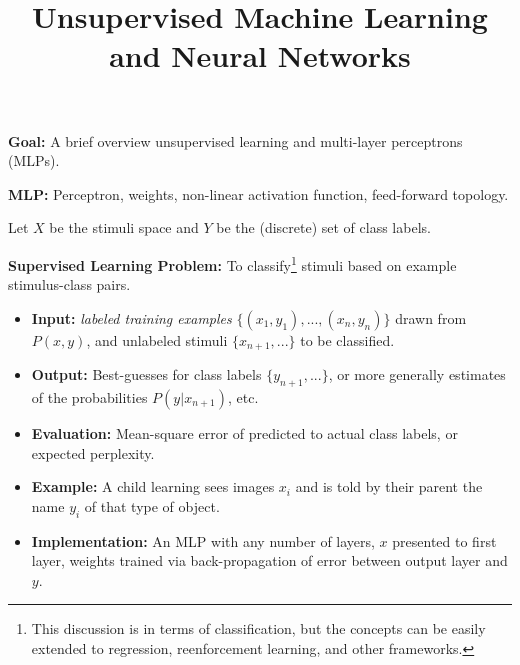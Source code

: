 \documentclass[12pt]{article}
\begin{document}
\title{\sc \large Unsupervised Machine Learning and Neural Networks\vspace{-2ex}}

\theoremstyle{definition}
\newtheorem{axiom}{Axiom}
\newtheorem{definition}{Definition}
\newtheorem{theorem}{Theorem}

\newcommand{\scare}[1]{`#1'} 

\setcounter{secnumdepth}{-1} 


\textbf{Goal:} A brief overview unsupervised learning and multi-layer perceptrons (MLPs).

\textbf{MLP:} Perceptron, weights, non-linear activation function, feed-forward topology.

Let $X$ be the stimuli space and $Y$ be the (discrete) set of class labels.

\textbf{Supervised Learning Problem:} To classify\footnote{ This discussion is in terms of classification, but the concepts can be easily extended to regression, reenforcement learning, and other frameworks.} stimuli based on example stimulus-class pairs.
\begin{itemize}
\item \textbf{Input:} \textit{labeled training examples} $\{(x_1,y_1),...,(x_n,y_n)\}$ drawn from $P(x,y)$,
  and unlabeled stimuli $\{x_{n+1},...\}$ to be classified.
\item \textbf{Output:} Best-guesses for class labels $\{y_{n+1},...\}$, 
  or more generally estimates of the probabilities $P(y|x_{n+1})$, etc.
\item \textbf{Evaluation:} Mean-square error of predicted to actual class labels, or expected perplexity.
\item \textbf{Example:} A child learning sees images $x_i$ and is told by their parent the name $y_i$ of that type of object.
\item \textbf{Implementation:} An MLP with any number of layers, $x$ presented to first layer, weights trained via back-propagation of error between output layer and $y$.
\end{itemize}
\end{document}
